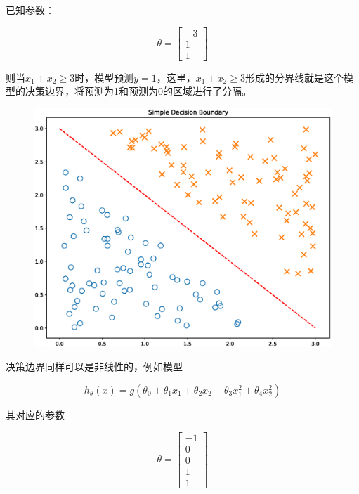 \documentclass[12pt, a4paper]{article}
\begin{document}
已知参数：

\begin{equation*}
    \theta=\left[
        \begin{matrix}
            -3 \\
            1  \\
            1
        \end{matrix}
        \right]
\end{equation*}

则当$x_1+x_2\geq 3$时，模型预测$y=1$，这里，$x_1+x_2\geq 3$形成的分界线就是这个模型的决策边界，将预测为1和预测为0的区域进行了分隔。

\begin{figure}[H]
    \includegraphics[width=1\textwidth]{SimpleDecisionBoundary.eps}
\end{figure}

决策边界同样可以是非线性的，例如模型

\begin{equation*}
    h_\theta(x)=g(\theta_0+\theta_1x_1+\theta_2x_2+\theta_3x_1^2+\theta_4x_2^2)
\end{equation*}

其对应的参数

\begin{equation*}
    \theta=\left[
        \begin{matrix}
            -1 \\
            0  \\
            0  \\
            1  \\
            1
        \end{matrix}
        \right]
\end{equation*}
\end{document}
